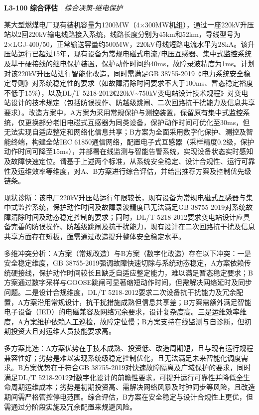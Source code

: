 \documentclass[11pt,a4paper]{ctexart}
\begin{document}
\noindent\textbf{L3-100} \hfill \textbf{综合评估} $|$ \textit{综合决策-继电保护}
\begin{description}[leftmargin=1.5em,style=nextline,font=\normalfont]
  \item[Q:] 某大型燃煤电厂现有装机容量为1200MW（4×300MW机组），通过一座220kV升压站以2回220kV输电线路接入系统，线路长度分别为45km和52km，导线型号为2×LGJ-400/50，正常输送容量约500MW，220kV母线短路电流水平为28kA。该升压站运行已超过15年，现有设备为常规电磁式电流/电压互感器、集中式监控系统及基于硬接线的继电保护装置，保护动作时间约40ms，故障录波精度为1ms。计划对该220kV升压站进行智能化改造，同时需满足GB 38755-2019《电力系统安全稳定导则》对系统稳定性的要求（如故障清除时间要求不大于100ms、暂态稳定裕度不低于15\%），以及DL/T 5218-2012《220kV\textasciitilde{}750kV变电站设计技术规程》对变电站设计的技术规定（包括防误操作、防越级跳闸、二次回路抗干扰能力及信息共享要求）。改造方案中，A方案为采用常规保护与测控装置，保留原有集中式监控系统，仅更换部分老旧电磁式互感器为同类设备，保护动作时间可优化至30ms，但无法实现自适应整定和网络化信息共享；B方案为全面采用数字化保护、测控及智能终端，构建全站IEC 61850通信网络，配置电子式互感器（采样精度0.2级，保护动作时间可降至15ms），并部署在线监测与智能告警系统，实现设备状态实时感知及故障快速定位。请基于上述两个标准，从系统安全稳定、设计合规性、运行可靠性及运维效率等维度，对A、B方案进行综合评估，并给出推荐方案及控制优先级链条。
  \item[A:] 现状诊断：该电厂220kV升压站运行年限较长，现有设备为常规电磁式互感器与集中式监控系统，保护动作时间及故障录波精度已无法满足GB 38755-2019对系统故障清除时间及动态稳定控制的要求；同时，DL/T 5218-2012要求变电站设计应具备完善的防误操作、防越级跳闸及抗干扰能力，现有设计在二次回路抗干扰及信息共享方面存在短板，亟需通过改造提升整体安全稳定水平。

多维冲突分析：A方案（常规改造）与B方案（数字化改造）存在以下冲突：一是安全稳定维度，GB 38755-2019强调故障快速切除与系统动态稳定，A方案依赖传统硬接线，保护动作时间较长且缺乏自适应整定能力，难以满足暂态稳定要求；B方案通过数字采样与GOOSE跳闸可显著缩短动作时间，但需解决网络延时及同步问题。二是设计合规维度，DL/T 5218-2012要求二次设备抗干扰能力及冗余配置，A方案沿用常规设计，抗干扰措施成熟但信息共享差；B方案需额外满足智能电子设备（IED）的电磁兼容及网络冗余要求，设计复杂度高。三是运维效率维度，A方案维护依赖人工巡检，故障定位慢；B方案支持在线监测与自诊断，但初期投资大且对运维人员技能要求高。

多方案比选：A方案优势在于技术成熟、投资低、改造周期短，且与现有运行规程兼容性好；劣势是难以实现系统级稳定控制优化，且无法满足未来智能化调度需求。B方案优势在于符合GB 38755-2019对快速故障隔离及广域保护的要求，同时满足DL/T 5218-2012对数字化设计的前瞻性要求，可提升运行可靠性并降低全生命周期运维成本；劣势是初期投资高、需解决网络风暴及时钟同步等风险，且改造期间需严格管控停电范围。综合评估，B方案在安全稳定与设计合规性上更优，但需通过分阶段实施及冗余配置来规避风险。


\end{description}
\end{document}
